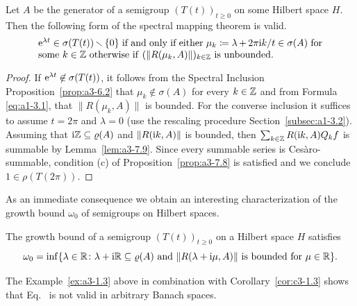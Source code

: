 \begin{theorem}\label{thm:a3-7.10}
%
Let $A$ be the generator of a semigroup $(T(t))_{t\geq 0}$ on some Hilbert space $H$.
Then the following form of the spectral mapping theorem is valid.
\[
\begin{minipage}{.85\textwidth}
	$ \eu^{\lambda t} \in \sigma(T(t))\setminus\{0\} $ if and only if either 
	$\mu_{k}\coloneq \lambda + 2\pi\im  k/t \in \sigma(A)$ for some  $k \in \Z$
	otherwise  if\/ $(\|R(\mu_{k},A)\|)_{k\in\Z}$ is unbounded.
\end{minipage}
\]
\end{theorem}
\begin{proof}
If\/ $\mathrm{e}^{\lambda t} \not\in \sigma(T(t))$, it follows from the Spectral Inclusion Proposition~\ref{prop:a3-6.2} that $\mu_{k} \not\in \sigma(A)$ for every $k \in \mathbb{Z}$ and from Formula \eqref{eq:a1-3.1},  that $\|R(\mu_{k},A)\|$ is bounded.
For the converse inclusion it suffices to assume $t = 2\pi$ and $\lambda = 0$ (use the rescaling procedure Section~\ref{subsec:a1-3.2}).
Assuming that $\im\Z \subseteq \rho(A)$ and $\|R(\mathrm{i} k,A)\|$ is bounded, then $\sum_{k\in\mathbb{Z}} R(\mathrm{i} k,A)Q_{k}f$ is summable by Lemma~\ref{lem:a3-7.9}.
Since every summable series is Cesàro-summable, condition (c) of Proposition~\ref{prop:a3-7.8} is satisfied and we conclude $1 \in \rho(T(2\pi))$.
\end{proof}
As an immediate consequence we obtain an interesting characterization of the growth bound $\omega_{0}$ of semigroups on Hilbert spaces.
\begin{corollary}\label{cor:a3-7.11}
%
The growth bound 
of a semigroup $(T(t))_{t\geq 0}$ on a Hilbert space $H$ satisfies
\begin{equation}\label{eq:a3-7.9}
\omega_{0} = \inf \{\lambda \in \R \colon \lambda + \im\R \subseteq \rho(A) \text{ and } \|R(\lambda+\im\mu,A)\| \text{ is bounded for } \mu \in \R\} .
\end{equation}
\end{corollary}
The Example~\ref{ex:a3-1.3} above in combination with Corollary~\ref{cor:c3-1.3} shows that Eq.~ is not valid in arbitrary Banach spaces.
